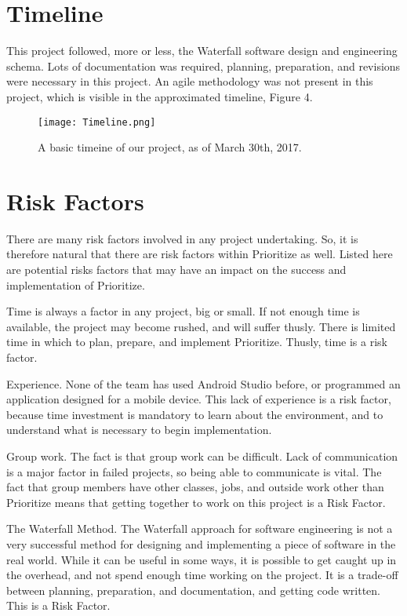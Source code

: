 \documentclass[12pt]{article}
\begin{document}
\section{Timeline}

This project followed, more or less, the Waterfall software design and engineering schema. Lots of documentation was required, planning, preparation, and revisions were necessary in this project. An agile methodology was not present in this project, which is visible in the approximated timeline, Figure 4.

\begin{figure}[h]
\texttt{[image: Timeline.png]}
\centering
\caption{A basic timeine of our project, as of March 30th, 2017.}
\end{figure}


\section{Risk Factors}
There are many risk factors involved in any project undertaking. So, it is therefore natural that there are risk factors within Prioritize as well. Listed here are potential risks factors that may have an impact on the success and implementation of Prioritize.

Time is always a factor in any project, big or small. If not enough time is available, the project may become rushed, and will suffer thusly. There is limited time in which to plan, prepare, and implement Prioritize. Thusly, time is a risk factor.

Experience. None of the team has used Android Studio before, or programmed an application designed for a mobile device. This lack of experience is a risk factor, because time investment is mandatory to learn about the environment, and to understand what is necessary to begin implementation.

Group work. The fact is that group work can be difficult. Lack of communication is a major factor in failed projects, so being able to communicate is vital. The fact that group members have other classes, jobs, and outside work other than Prioritize means that getting together to work on this project is a Risk Factor. 

The Waterfall Method. The Waterfall approach for software engineering is not a very successful method for designing and implementing a piece of software in the real world. While it can be useful in some ways, it is possible to get caught up in the overhead, and not spend enough time working on the project. It is a trade-off between planning, preparation, and documentation, and getting code written. This is a Risk Factor.
\end{document}
